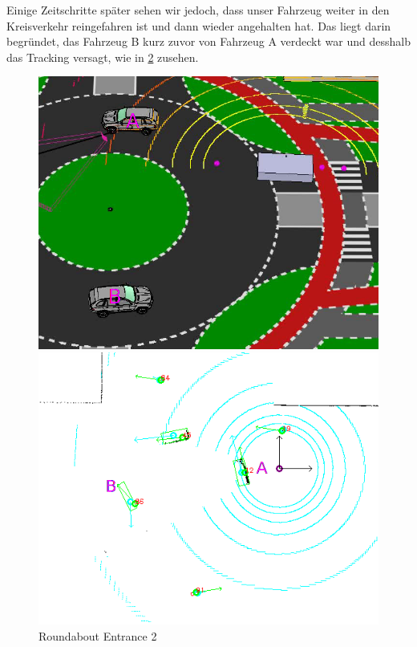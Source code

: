 \documentclass[11pt,oneside,openright]{mpreport}
\begin{document}
\begin{figure}[htb]
\begin{minipage}[t]{0.49\textwidth}
    \end{minipage}
    \label{roundabout_entrance_1}
\end{figure}

Einige Zeitschritte später sehen wir jedoch, dass unser Fahrzeug weiter in den Kreisverkehr reingefahren ist und dann wieder angehalten hat.
Das liegt darin begründet, das Fahrzeug B kurz zuvor von Fahrzeug A verdeckt war und desshalb das Tracking versagt, wie in \cref{roundabout_entrance_2} zusehen.


\begin{figure}[htb]
  \caption{Roundabout Entrance 2} 
    \centering
    \begin{minipage}[t]{0.49\textwidth}
        \centering
          \includegraphics[width=\textwidth]{bilder/sim03.png}
    \end{minipage}%
    \hfill
    \begin{minipage}[t]{0.49\textwidth}
        \centering
	\includegraphics[width=\textwidth]{bilder/sim04.png}
    \end{minipage}
    \label{roundabout_entrance_2}
\end{figure}
\end{document}
